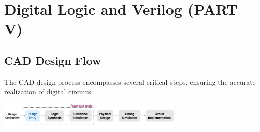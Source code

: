 \documentclass[12pt,openany]{book}
\begin{document}
			      	\chapter{Digital Logic and Verilog (PART V)}
			      	
			      	\section{CAD Design Flow}
			      	The CAD design process encompasses several critical steps, ensuring the accurate realization of digital circuits. 
			      	
			      	\begin{center}
			      		\includegraphics[width=0.67\textwidth]{circuits/10.1.png}
			      	\end{center}
			      	
			      	
			      	
\end{document}
